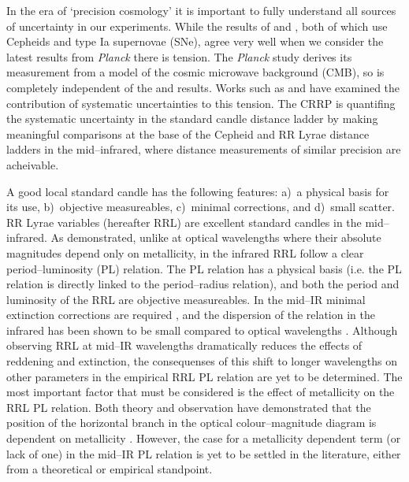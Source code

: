 \documentclass[a4paper,fleqn,usenatbib]{mnras}
\begin{document}
In the era of `precision cosmology' it is important to fully understand all sources of uncertainty in our experiments. While the results of  \citet{2011ApJ...730..119R} and \citet{2012ApJ...758...24F}, both of which use Cepheids and type Ia supernovae (SNe), agree very well 
when we consider the latest results from {\it Planck} 
 there is tension. The {\it Planck} study derives its measurement from a model of the cosmic microwave background (CMB), so is completely independent of the \citeauthor{2011ApJ...730..119R} and \citeauthor{2012ApJ...758...24F} results. Works such as \citet{2015ApJ...802...20R} and \citet{2014MNRAS.440.1138E} have examined the contribution of systematic uncertainties to this tension. The CRRP is quantifing the systematic uncertainty in the standard candle distance ladder by making meaningful comparisons at the base of the Cepheid and RR Lyrae distance ladders in the mid--infrared, where distance measurements of similar precision are acheivable. 

A good local standard candle \citep[as defined by][]{1986ApJ...303....1A} has the following  features: a)~a physical basis for its use, b)~objective measureables, c)~minimal corrections, and d)~small scatter. RR Lyrae variables (hereafter RRL) are excellent standard candles in the mid--infrared. As \citet{1986MNRAS.220..279L} demonstrated, unlike at optical wavelengths where their absolute magnitudes depend only on metallicity, in the infrared RRL follow a clear period--luminosity (PL) relation. The PL relation has a physical basis (i.e. the PL relation is directly linked to the period--radius relation), and both the period and luminosity of the RRL are objective measureables. In the mid--IR minimal extinction corrections are required \citep[$A_{[3.6]} \approx A_{V}/16$,][]{2005ApJ...619..931I}, and the dispersion of the relation in the infrared has been shown to be small compared to optical wavelengths \citep{2015ApJ...808...50M, 2004ApJS..154..633C}. 
Although observing RRL at mid--IR wavelengths dramatically reduces the effects of reddening and extinction, the consequenses of this shift to longer wavelengths on other parameters in the empirical RRL PL relation are yet to be determined. The most important factor that must be considered is the effect of metallicity on the RRL PL relation. Both theory and observation have demonstrated that the position of the horizontal branch in the optical colour--magnitude diagram is dependent on metallicity \citep[e.g.][]{2015ApJ...808...50M, 2004ApJS..154..633C, 2003MNRAS.344.1097B, 1994AJ....108..222N}. However, the case for a metallicity dependent term (or lack of one) in the mid--IR PL relation is yet to be settled in the literature, either from a theoretical or empirical standpoint. 
\end{document}
